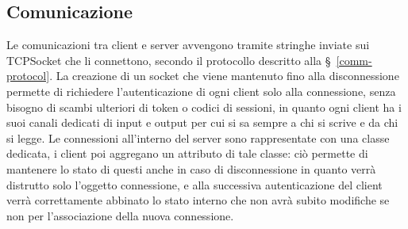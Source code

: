 \clearpage
\subsection{Comunicazione}
\label{communication-section}

Le comunicazioni tra client e server avvengono tramite stringhe inviate sui TCPSocket che li connettono, secondo il protocollo descritto alla \S\ \ref{comm-protocol}. La creazione di un socket che viene mantenuto fino alla disconnessione permette di richiedere l'autenticazione di ogni client solo alla connessione, senza bisogno di scambi ulteriori di token o codici di sessioni, in quanto ogni client ha i suoi canali dedicati di input e output per cui si sa sempre a chi si scrive e da chi si legge. Le connessioni all'interno del server sono rappresentate con una classe dedicata, i client poi aggregano un attributo di tale classe: ciò permette di mantenere lo stato di questi anche in caso di disconnessione in quanto verrà distrutto solo l'oggetto connessione, e alla successiva autenticazione del client verrà correttamente abbinato lo stato interno che non avrà subito modifiche se non per l'associazione della nuova connessione.
